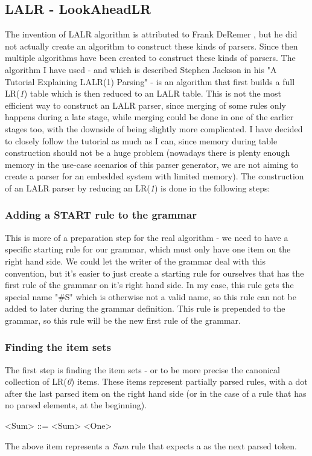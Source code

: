 \subsection{LALR - LookAheadLR}
The invention of LALR algorithm is attributed to Frank DeRemer \cite{deremer1969practical}, but he did not actually create an algorithm to construct these kinds of parsers. Since then multiple algorithms have been created to construct these kinds of parsers. The algorithm I have used - and which is described Stephen Jackson in his "A Tutorial Explaining LALR(1) Parsing" \cite{lalr1} - is an algorithm that first builds a full LR(\textit{1}) table which is then reduced to an LALR table. This is not the most efficient way to construct an LALR parser, since merging of some rules only happens during a late stage, while merging could be done in one of the earlier stages too, with the downside of being slightly more complicated. I have decided to closely follow the tutorial as much as I can, since memory during table construction should not be a huge problem (nowadays there is plenty enough memory in the use-case scenarios of this parser generator, we are not aiming to create a parser for an embedded system with limited memory). 
The construction of an LALR parser by reducing an LR(\textit{1}) is done in the following steps:
\subsubsection{Adding a START rule to the grammar}
This is more of a preparation step for the real algorithm - we need to have a specific starting rule for our grammar, which must only have one item on the right hand side. We could let the writer of the grammar deal with this convention, but it's easier to just create a starting rule for ourselves that has the first rule of the grammar on it's right hand side. In my case, this rule gets the special name "\#S" which is otherwise not a valid name, so this rule can not be added to later during the grammar definition. This rule is prepended to the grammar, so this rule will be the new first rule of the grammar. 
\subsubsection{Finding the item sets} 
The first step is finding the item sets - or to be more precise the canonical collection of LR(\textit{0}) items. These items represent partially parsed rules, with a dot after the last parsed item on the right hand side (or in the case of a rule that has no parsed elements, at the beginning).
\begin{grammar}
<Sum> ::= <Sum> \textbullet \lit{+} <One>
\end{grammar}
The above item represents a \textit{Sum} rule that expects a \lit{+} as the next parsed token.

